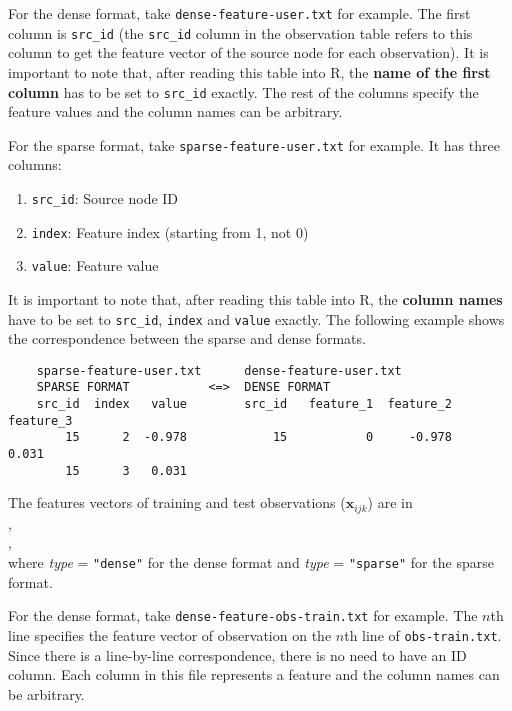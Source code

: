 \documentclass[10pt]{article}
\newcommand{\parahead}[1]{\vspace{0.15in}\noindent{\bf #1:}}
\begin{document}
For the dense format, take {\tt dense-feature-user.txt} for example.  The first column is {\tt src\_id} (the {\tt src\_id} column in the observation table refers to this column to get the feature vector of the source node for each observation).  It is important to note that, after reading this table into R, the {\bf name of the first column} has to be set to {\tt src\_id} exactly.  The rest of the columns specify the feature values and the column names can be arbitrary.

For the sparse format, take {\tt sparse-feature-user.txt} for example.  It has three columns:
\begin{enumerate}
\item {\tt src\_id}: Source node ID
\item {\tt index}: Feature index (starting from 1, not 0)
\item {\tt value}: Feature value
\end{enumerate}
It is important to note that, after reading this table into R, the {\bf column names} have to be set to {\tt src\_id}, {\tt index} and {\tt value} exactly.  The following example shows the correspondence between the sparse and dense formats.
{\small\begin{verbatim}
    sparse-feature-user.txt      dense-feature-user.txt
    SPARSE FORMAT           <=>  DENSE FORMAT
    src_id  index   value        src_id   feature_1  feature_2  feature_3
        15      2  -0.978            15           0     -0.978      0.031
        15      3   0.031
\end{verbatim}}

\parahead{Observation Features}
The features vectors of training and test observations ($\bm{x}_{ijk}$) are in\\
, \\
, \\
where {\it type} = {\tt "dense"} for the dense format and {\it type} = {\tt "sparse"} for the sparse format.

For the dense format, take {\tt dense-feature-obs-train.txt} for example.  The $n$th line specifies the feature vector of observation on the $n$th line of {\tt obs-train.txt}.  Since there is a line-by-line correspondence, there is no need to have an ID column.  Each column in this file represents a feature and the column names can be arbitrary.
\end{document}
